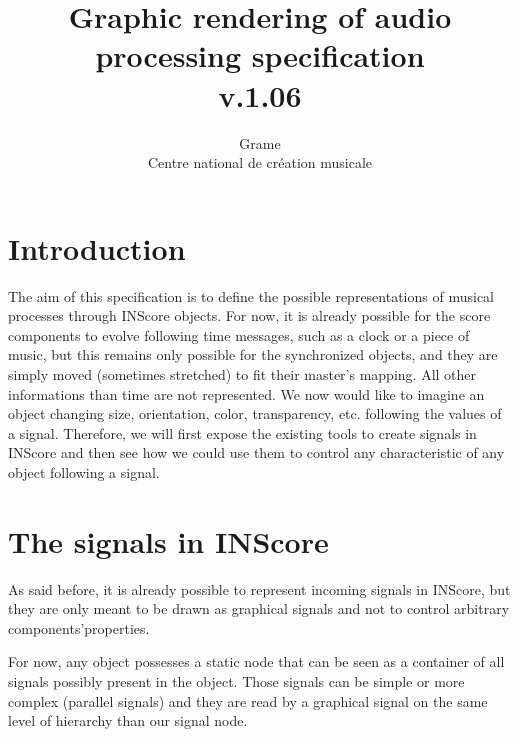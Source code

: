 \documentclass[a4paper]{article}
\begin{document}
\title{Graphic rendering of audio processing specification \\ v.1.06}

\author{Grame \\ Centre national de cr\'eation musicale}

\maketitle

\section*{Introduction}\label{sec:intro}

The aim of this specification is to define the possible representations of musical processes through INScore objects. For now, it is already possible for the score components to evolve following time messages, such as a clock or a piece of music, but this remains only possible for the synchronized objects, and they are simply moved (sometimes stretched) to fit their master's mapping. All other informations than time are not represented. We now would like to imagine an object changing size, orientation, color, transparency, etc. following the values of a signal. Therefore, we will first expose the existing tools to create signals in INScore and then see how we could use them to control any characteristic of any object following a signal.

\section{The signals in INScore}\label{sec:signals}

As said before, it is already possible to represent incoming signals in INScore, but they are only meant to be drawn as graphical signals and not to control arbitrary  components'properties.

For now, any object possesses a static node that can be seen as a container of all signals possibly present in the object. Those signals can be simple or more complex (parallel signals) and they are read by a graphical signal on the same level of hierarchy than our signal node.
\end{document}
